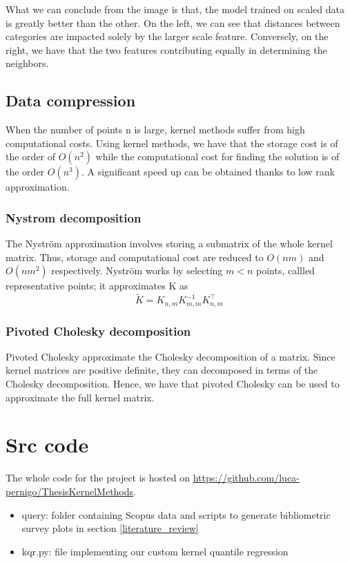 What we can conclude from the image is that, the model trained on scaled data is greatly better than the other.
On the left, we can see that distances between categories are impacted solely by the larger scale feature. Conversely, on the right, we have that the two features contributing equally in determining the neighbors.

\subsection{Data compression}
When the number of points n is large, kernel methods suffer from high computational costs. 
Using kernel methods, we have that the storage cost is of the order of $O(n^2)$ while the computational cost for finding the solution is of the order $O(n^3)$.
A significant speed up can be obtained thanks to low rank approximation.


\subsubsection{Nystrom decomposition}
The Nyström approximation involves storing a submatrix of the whole kernel matrix. Thus, storage and computational cost are reduced to $O(nm)$ and $O(nm^2)$ respectively.
Nyström works by selecting $m<n$ points, callled representative points; it approximates K as
\begin{equation}
    \tilde {K}=K_{n,m} K_{m,m}^{-1}K_{n,m}^\intercal
\end{equation}


\subsubsection{Pivoted Cholesky decomposition}
Pivoted Cholesky approximate the Cholesky decomposition of a matrix. Since kernel matrices are positive definite, they can decomposed in terms of the Cholesky decomposition. Hence, we have that pivoted Cholesky can be used to approximate the full kernel matrix.


\newpage
\section{Src code}\label{src_code}
The whole code for the project is hosted on
\url{https://github.com/luca-pernigo/ThesisKernelMethods}\label{github_repo}.
\\
\begin{itemize}
    \item query: folder containing Scopus data and scripts to generate bibliometric survey plots in section \ref{literature_review}
    \item kqr.py: file implementing our custom kernel quantile regression
\end{itemize}
